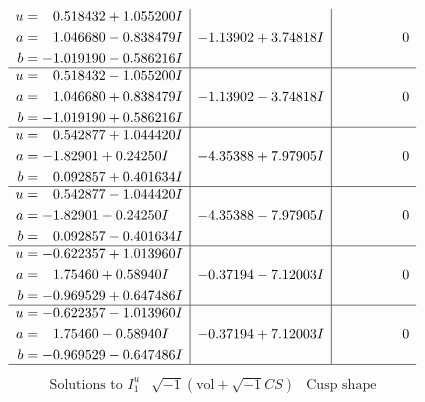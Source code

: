 \documentclass[1p]{elsarticle_modified}
\theoremstyle{definition}
\newcommand{\I}{\sqrt{-1}}
\begin{document}
$$\begin{array}{c|c|c}
\begin{aligned}
u &= \phantom{-}0.518432 + 1.055200 I \\
a &= \phantom{-}1.046680 - 0.838479 I \\
b &= -1.019190 - 0.586216 I\end{aligned}
 & -1.13902 + 3.74818 I & \phantom{-0.000000 } 0 \\ \hline\begin{aligned}
u &= \phantom{-}0.518432 - 1.055200 I \\
a &= \phantom{-}1.046680 + 0.838479 I \\
b &= -1.019190 + 0.586216 I\end{aligned}
 & -1.13902 - 3.74818 I & \phantom{-0.000000 } 0 \\ \hline\begin{aligned}
u &= \phantom{-}0.542877 + 1.044420 I \\
a &= -1.82901 + 0.24250 I \\
b &= \phantom{-}0.092857 + 0.401634 I\end{aligned}
 & -4.35388 + 7.97905 I & \phantom{-0.000000 } 0 \\ \hline\begin{aligned}
u &= \phantom{-}0.542877 - 1.044420 I \\
a &= -1.82901 - 0.24250 I \\
b &= \phantom{-}0.092857 - 0.401634 I\end{aligned}
 & -4.35388 - 7.97905 I & \phantom{-0.000000 } 0 \\ \hline\begin{aligned}
u &= -0.622357 + 1.013960 I \\
a &= \phantom{-}1.75460 + 0.58940 I \\
b &= -0.969529 + 0.647486 I\end{aligned}
 & -0.37194 - 7.12003 I & \phantom{-0.000000 } 0 \\ \hline\begin{aligned}
u &= -0.622357 - 1.013960 I \\
a &= \phantom{-}1.75460 - 0.58940 I \\
b &= -0.969529 - 0.647486 I\end{aligned}
 & -0.37194 + 7.12003 I & \phantom{-0.000000 } 0\\
 \hline 
 \end{array}$$\newpage$$\begin{array}{c|c|c}  
\text{Solutions to }I^u_{1}& \I (\text{vol} + \sqrt{-1}CS) & \text{Cusp shape}\\
 \hline 
\begin{aligned}

\end{aligned}
\end{array}$$
\end{document}
